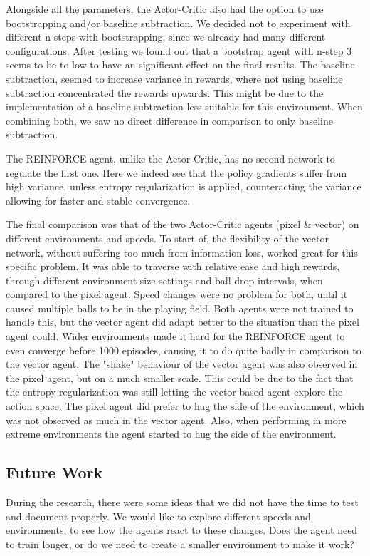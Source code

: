 \documentclass{article}
\begin{document}
Alongside all the parameters, the Actor-Critic also had the option to use bootstrapping and/or baseline subtraction. 
We decided not to experiment with different n-steps with bootstrapping, since we already had many different configurations.
After testing we found out that a bootstrap agent with n-step 3 seems to be to low to have an significant effect on the final results. 
The baseline subtraction, seemed to increase variance in rewards, where not using baseline subtraction concentrated the rewards upwards. 
This might be due to the implementation of a baseline subtraction less suitable for this environment. 
When combining both, we saw no direct difference in comparison to only baseline subtraction. 

The REINFORCE agent, unlike the Actor-Critic, has no second network to regulate the first one. 
Here we indeed see that the policy gradients suffer from high variance, unless entropy regularization is applied, counteracting the variance allowing for faster and stable convergence. 

The final comparison was that of the two Actor-Critic agents (pixel \& vector) on different environments and speeds.
To start of, the flexibility of the vector network, without suffering too much from information loss, worked great for this specific problem. 
It was able to traverse with relative ease and high rewards, through different environment size settings and ball drop intervals, when compared to the pixel agent.
Speed changes were no problem for both, until it caused multiple balls to be in the playing field. 
Both agents were not trained to handle this, but the vector agent did adapt better to the situation than the pixel agent could. 
Wider environments made it hard for the REINFORCE agent to even converge before 1000 episodes, causing it to do quite badly in comparison to the vector agent.
The "shake" behaviour of the vector agent was also observed in the pixel agent, but on a much smaller scale.
This could be due to the fact that the entropy regularization was still letting the vector based agent explore the action space.  
The pixel agent did prefer to hug the side of the environment, which was not observed as much in the vector agent.
Also, when performing in more extreme environments the agent started to hug the side of the environment. 

\subsection{Future Work}
During the research, there were some ideas that we did not have the time to test and document properly.
We would like to explore different speeds and environments, to see how the agents react to these changes.
Does the agent need to train longer, or do we need to create a smaller environment to make it work?
\end{document}
